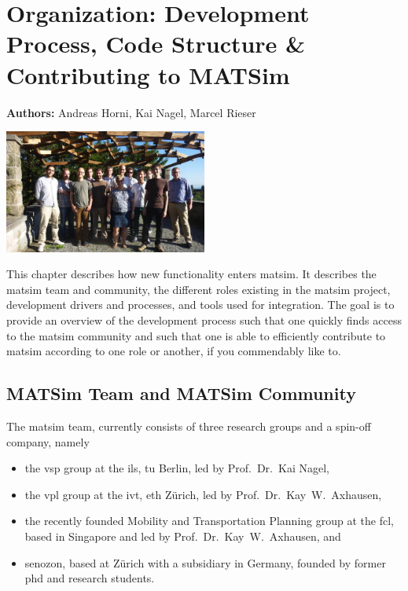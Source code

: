 \chapter{Organization: Development Process, Code Structure \& Contributing to MATSim}
\label{ch:developmentprocess}

\hfill \textbf{Authors:} Andreas Horni, Kai Nagel, Marcel Rieser

\begin{center} \includegraphics[width=0.5\textwidth, angle=0]{extending/figures/ConceptualMeetingVillaHatt.png} \end{center}

This chapter describes how new functionality enters \gls{matsim}. It describes the \gls{matsim} team and community, the different roles existing in the \gls{matsim} project, development drivers and processes, and tools used for integration. The goal is to 
provide an overview of the development process such that 
one quickly finds access to the \gls{matsim} community and such that 
one is able to efficiently contribute to \gls{matsim} according to one role or another, if you commendably like to.

\section{MATSim Team and MATSim Community}
The \gls{matsim} team, 
currently consists of three research groups and a spin-off company, namely 
\begin{itemize}\styleItemize
\item the \gls{vsp} group at the \gls{ils}, \gls{tu} Berlin, led by Prof.~Dr.~Kai Nagel,
\item the \gls{vpl} group at the \gls{ivt}, \gls{eth} Zürich, led by Prof.~Dr.~Kay~W.~Axhausen, 
\item the recently founded Mobility and Transportation Planning group at the \gls{fcl}, based in Singapore and led by Prof.~Dr.~Kay~W.~Axhausen, and 
\item \gls{senozon}, based at Zürich with a subsidiary in Germany, founded by former \gls{phd} and research students. 
\end{itemize}

